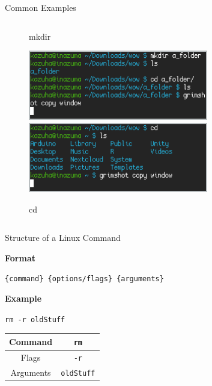 \documentclass{beamer}
\begin{document}
\begin{frame}{Common Examples}
\begin{columns}
\begin{column}{0.33\textwidth}
\begin{figure}
				\caption{mkdir}
				\includegraphics[width=0.7\textwidth]{mkdir.png}
				\includegraphics[width=0.7\textwidth]{cd.png}
				\caption{cd}
			\end{figure}
		\end{column}
	\end{columns}
\end{frame}

\begin{frame}{Structure of a Linux Command}
	\begin{Large}
		\textbf{Format} \\
	\end{Large}
	\texttt{\{command\} \{options/flags\} \{arguments\}}

	\vspace{0.3cm}

	\begin{Large}
		\textbf{Example} \\
	\end{Large}
	\texttt{rm -r oldStuff}

	\vspace{0.3cm}

	\begin{tabular}{|c|c|}
		\hline
		Command & \texttt{rm} \\
		\hline
		Flags & \texttt{-r} \\
		\hline
		Arguments & \texttt{oldStuff} \\
		\hline
	\end{tabular}
\end{frame}
\end{document}
